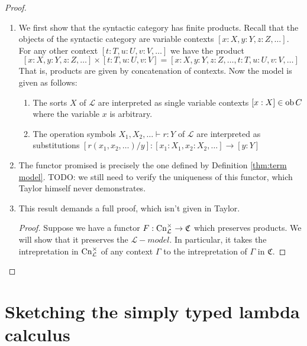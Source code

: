 \documentclass[12pt,twoside]{reedthesis}
\theoremstyle{definition}
\theoremstyle{remark}
\theoremstyle{plain}
\begin{document}
\begin{proof}\,\\
  \begin{enumerate}
    \item We first show that the syntactic category has finite products. Recall
    that the objects of the syntactic category are variable contexts \([x : X, y
    : Y, z : Z, \dots]\). For any other context \( [t : T, u : U, v : V, \dots]
    \) we have the product \[ [x : X, y : Y, z : Z, \dots] \times [t : T, u : U,
    v : V] = [x : X, y : Y, z : Z, \dots, t : T, u : U, v : V, \dots]\] That
    is, products are given by concatenation of contexts. Now the model is given
    as follows:
    \begin{enumerate}
      \item The sorts $X$ of $\mathcal{L}$ are interpreted as single variable
      contexts $[x:X] \in \mathrm{ob}\, C$ where the variable $x$ is arbitrary.
      \item The operation symbols \( X_1, X_2, \dots \vdash r : Y \) of
      $\mathcal{L}$ are interpreted as substitutions \( [r(x_1, x_2, \dots)/y] :
      [x_1:X_1, x_2:X_2,\dots] \rightarrow [y : Y]\) 
    \end{enumerate}
    \item The functor promised is precisely the one defined by Definition
          \ref{thm:term model}. TODO: we still need to verify the uniqueness of
          this functor, which Taylor himself never demonstrates.
          \item This result demands a full proof, which isn't given in Taylor.
          \begin{proof}
            Suppose we have a functor $F : \mathrm{Cn}_{\mathcal{L}}^{\times} \rightarrow \mathfrak{C}$
            which preserves products. We will show that it preserves the
            $\mathcal{L}-model$. In particular, it takes the intrepretation in
            $\mathrm{Cn}_{\mathcal{L}}^{\times}$ of any context $\Gamma$ to the intrepretation of
            $\Gamma$ in $\mathfrak{C}$.
          \end{proof}



  \end{enumerate}
\end{proof}


\section{Sketching the simply typed lambda calculus}
\end{document}
